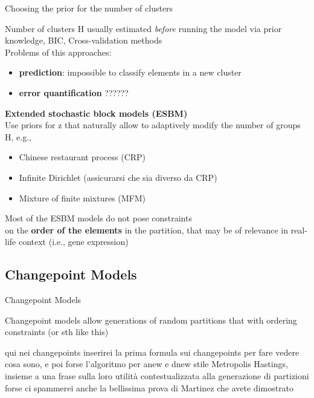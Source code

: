 \begin{frame}{Choosing the prior for the number of clusters}

Number of clusters H usually estimated \textit{before} running the model via prior knowledge, BIC, Cross-validation methods\\
Problems of this approaches: 
\begin{itemize}
    \item\textbf{prediction}: impossible to classify elements in a new cluster
    \item \textbf{error quantification} ??????
\end{itemize}
\hline 
\textbf{\alert{Extended stochastic block models (ESBM)}}\\  
Use priors for z that naturally allow to adaptively modify the number of groups H, e.g., 
\begin{itemize}
    \item Chinese restaurant process (CRP)
    \item Infinite Dirichlet (assicurarsi che sia diverso da CRP)
    \item Mixture of finite mixtures (MFM)\\
\end{itemize}

\centering
Most of the ESBM models do not pose constraints\\ on the \textbf{order of the elements} in the partition, that may be of relevance in real-life context (i.e., gene expression)
\end{frame}








\subsection{Changepoint Models}
\begin{frame}{Changepoint Models}

Changepoint models allow generations of random partitions that with ordering constraints (or sth like this)

qui nei changepoints inserirei la prima formula sui changepoints 
per fare vedere cosa sono, e poi forse l'algoritmo per anew e dnew stile Metropolis Hastings, insieme a una frase sulla loro utilità contestualizzata alla generazione di partizioni
forse ci spammerei anche la bellissima prova di Martinez che avete dimostrato 


\end{frame}








